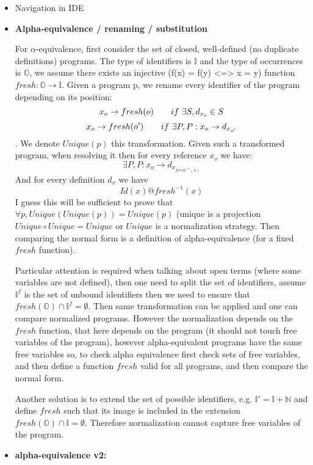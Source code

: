 \begin{itemize}
\itemsep1pt\parskip0pt
\item
  Navigation in IDE
\item {\bf 
  Alpha-equivalence / renaming / substitution}

For $\alpha$-equivalence, first consider the set of closed, well-defined (no duplicate definitions) programs. The type of identifiers is $\mathbb{I}$ and the type of occurrences is $\mathbb{O}$, we assume there exists an injective (f(x) = f(y) <=> x = y) function $fresh : \mathbb{O} \rightarrow \mathbb{I}$. Given a program p, we rename every identifier of the program depending on its position:
$$ x_o \rightarrow fresh(o)\tab\tab\ if\ \exists S, d_{x_o} \in S $$
$$ x_o \rightarrow fresh(o')\tab\tab\ if\ \exists P, P : x_o \rightarrow d_{x_{o'}}  $$.
We denote $Unique(p)$ this transformation.
Given such a transformed program, when resolving it then for every reference $x_o$ we have:
$$ \exists P, P : x_o \rightarrow d_{x_{fresh^{-1}(x)}}$$
And for every definition $d_{x}$ we have 
$$ Id(x) @ fresh^{-1}(x)$$
I guess this will be sufficient to prove that $\forall p, Unique(Unique(p)) = Unique(p)$ (unique is a projection $Unique\circ Unique = Unique$ or $Unique$ is a normalization strategy. Then comparing the normal form is a definition of alpha-equivalence (for a fixed $fresh$ function).

Particular attention is required when talking about open terms (where some variables are not defined), then one need to split the set of identifiers, assume $\mathbb{I}^f$ is the set of unbound identifiers then we need to ensure that $fresh(\mathbb{O}) \cap \mathbb{I}^f = \emptyset$.
Then same transformation can be applied and one can compare normalized programs. 
However the normalization depends on the $fresh$ function, that here depends on the program (it should not touch free variables of the program), however alpha-equivalent programs have the same free variables so, to check alpha equivalence first check sets of free variables, and then define a function $fresh$ valid for all programs, and then compare the normal form.

Another solution is to extend the set of possible identifiers, e.g. $\mathbb{I}' = \mathbb{I} + \mathbb{N}$ and define $fresh$ such that its image is included in the extension $fresh(\mathbb{O}) \cap \mathbb{I} = \emptyset$. Therefore normalization cannot capture free variables of the program.

\item {\bf alpha-equivalence v2:}


\end{itemize}
